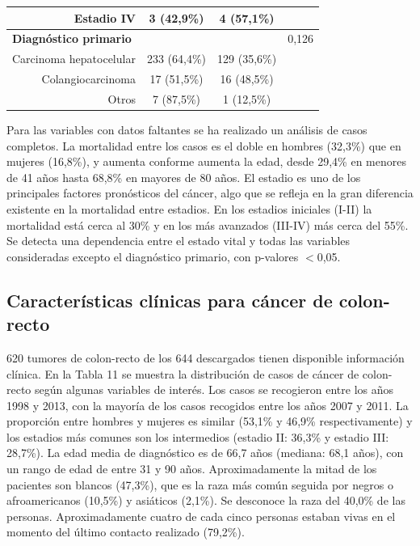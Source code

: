 \begin{table}[H]
\begin{tabular}{rccc}
		Estadio IV                                        & 3 (42,9\%)     & 4 (57,1\%)          &                      \\ \hline
		\multicolumn{1}{l}{\textbf{Diagnóstico primario}} &                &                     & 0,126                \\
		Carcinoma hepatocelular                           & 233 (64,4\%)   & 129 (35,6\%)        &                      \\
		Colangiocarcinoma                                 & 17 (51,5\%)    & 16 (48,5\%)         &                      \\
		Otros                                             & 7 (87,5\%)     & 1 (12,5\%)          &                      \\ \hline
	\end{tabular}
\end{table}

Para las variables con datos faltantes se ha realizado un análisis de casos completos.  La mortalidad entre los casos es el doble en hombres (32,3\%) que en mujeres (16,8\%), y aumenta conforme aumenta la edad, desde 29,4\% en menores de 41 años hasta 68,8\% en mayores de 80 años. El estadio es uno de los principales factores pronósticos del cáncer, algo que se refleja en la gran diferencia existente en la mortalidad entre estadios. En los estadios iniciales (I-II) la mortalidad está cerca al 30\% y en los más avanzados (III-IV) más cerca del 55\%. Se detecta una dependencia entre el estado vital y todas las variables consideradas excepto el diagnóstico primario, con p-valores $<$0,05.

\subsection{Características clínicas para cáncer de colon-recto}

620 tumores de colon-recto de los 644 descargados tienen disponible información clínica. En la Tabla 11 se muestra  la distribución de casos de cáncer de colon-recto según algunas variables de interés. Los casos se recogieron entre los años 1998 y 2013, con la mayoría de los casos recogidos entre los años 2007 y 2011. La proporción entre hombres y mujeres es similar (53,1\% y 46,9\% respectivamente) y los estadios más comunes son los intermedios (estadio II: 36,3\% y estadio III: 28,7\%). La edad media de diagnóstico es de 66,7 años (mediana: 68,1 años), con un rango de edad de entre 31 y 90 años. Aproximadamente la mitad de los pacientes son blancos (47,3\%), que es la raza más común seguida por negros o afroamericanos (10,5\%) y asiáticos (2,1\%). Se desconoce la raza del 40,0\% de las personas. Aproximadamente cuatro de cada cinco personas estaban vivas en el momento del último contacto realizado (79,2\%).\\

